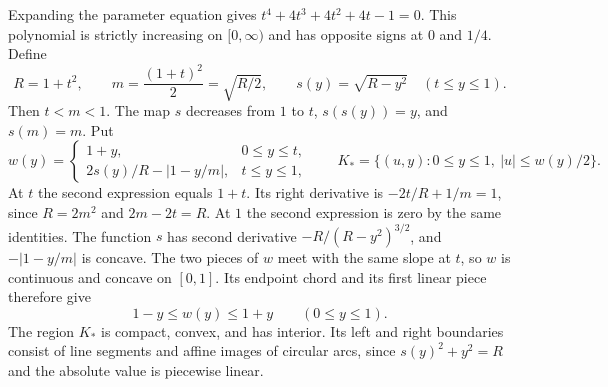 \documentclass[11pt]{article}
\begin{document}
Expanding the parameter equation gives
$t^4+4t^3+4t^2+4t-1=0$. This polynomial is strictly increasing on
$[0,\infty)$ and has opposite signs at $0$ and $1/4$. Define
\[
 R=1+t^2,\qquad m=\frac{(1+t)^2}{2}=\sqrt{R/2},\qquad
 s(y)=\sqrt{R-y^2}\quad(t\le y\le1).
\]
Then $t<m<1$. The map $s$ decreases from $1$ to $t$,
$s(s(y))=y$, and $s(m)=m$. Put
\begin{equation}\label{candidate}
 w(y)=
 \begin{cases}
  1+y,&0\le y\le t,\\[2pt]
  2s(y)/R-\lvert 1-y/m\rvert,&t\le y\le1,
 \end{cases}
 \qquad K_* = \{(u,y):0\le y\le1,\ |u|\le w(y)/2\}.
\end{equation}
At $t$ the second expression equals $1+t$. Its right derivative is
$-2t/R+1/m=1$, since $R=2m^2$ and $2m-2t=R$.
At $1$ the second expression is zero by the same identities.
The function $s$ has second derivative $-R/(R-y^2)^{3/2}$, and
$-|1-y/m|$ is concave. The two pieces of $w$ meet with the same
slope at $t$, so $w$ is continuous and concave on $[0,1]$.
Its endpoint chord and its first linear piece therefore give
\begin{equation}\label{sandwich}
 1-y\le w(y)\le1+y \qquad (0\le y\le1).
\end{equation}
The region $K_*$ is compact, convex, and has interior. Its left and
right boundaries consist of line segments and affine images of circular
arcs, since $s(y)^2+y^2=R$ and the absolute value is piecewise linear.
\end{document}
